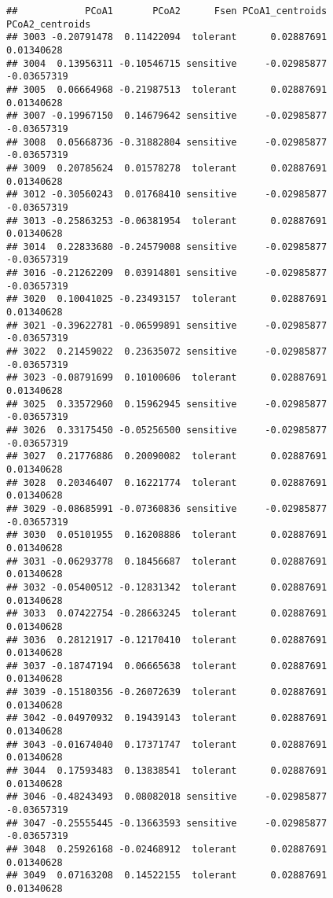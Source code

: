 \documentclass[
]{article}
\begin{document}
\begin{verbatim}
##            PCoA1       PCoA2      Fsen PCoA1_centroids PCoA2_centroids
## 3003 -0.20791478  0.11422094  tolerant      0.02887691      0.01340628
## 3004  0.13956311 -0.10546715 sensitive     -0.02985877     -0.03657319
## 3005  0.06664968 -0.21987513  tolerant      0.02887691      0.01340628
## 3007 -0.19967150  0.14679642 sensitive     -0.02985877     -0.03657319
## 3008  0.05668736 -0.31882804 sensitive     -0.02985877     -0.03657319
## 3009  0.20785624  0.01578278  tolerant      0.02887691      0.01340628
## 3012 -0.30560243  0.01768410 sensitive     -0.02985877     -0.03657319
## 3013 -0.25863253 -0.06381954  tolerant      0.02887691      0.01340628
## 3014  0.22833680 -0.24579008 sensitive     -0.02985877     -0.03657319
## 3016 -0.21262209  0.03914801 sensitive     -0.02985877     -0.03657319
## 3020  0.10041025 -0.23493157  tolerant      0.02887691      0.01340628
## 3021 -0.39622781 -0.06599891 sensitive     -0.02985877     -0.03657319
## 3022  0.21459022  0.23635072 sensitive     -0.02985877     -0.03657319
## 3023 -0.08791699  0.10100606  tolerant      0.02887691      0.01340628
## 3025  0.33572960  0.15962945 sensitive     -0.02985877     -0.03657319
## 3026  0.33175450 -0.05256500 sensitive     -0.02985877     -0.03657319
## 3027  0.21776886  0.20090082  tolerant      0.02887691      0.01340628
## 3028  0.20346407  0.16221774  tolerant      0.02887691      0.01340628
## 3029 -0.08685991 -0.07360836 sensitive     -0.02985877     -0.03657319
## 3030  0.05101955  0.16208886  tolerant      0.02887691      0.01340628
## 3031 -0.06293778  0.18456687  tolerant      0.02887691      0.01340628
## 3032 -0.05400512 -0.12831342  tolerant      0.02887691      0.01340628
## 3033  0.07422754 -0.28663245  tolerant      0.02887691      0.01340628
## 3036  0.28121917 -0.12170410  tolerant      0.02887691      0.01340628
## 3037 -0.18747194  0.06665638  tolerant      0.02887691      0.01340628
## 3039 -0.15180356 -0.26072639  tolerant      0.02887691      0.01340628
## 3042 -0.04970932  0.19439143  tolerant      0.02887691      0.01340628
## 3043 -0.01674040  0.17371747  tolerant      0.02887691      0.01340628
## 3044  0.17593483  0.13838541  tolerant      0.02887691      0.01340628
## 3046 -0.48243493  0.08082018 sensitive     -0.02985877     -0.03657319
## 3047 -0.25555445 -0.13663593 sensitive     -0.02985877     -0.03657319
## 3048  0.25926168 -0.02468912  tolerant      0.02887691      0.01340628
## 3049  0.07163208  0.14522155  tolerant      0.02887691      0.01340628
\end{verbatim}
\end{document}
